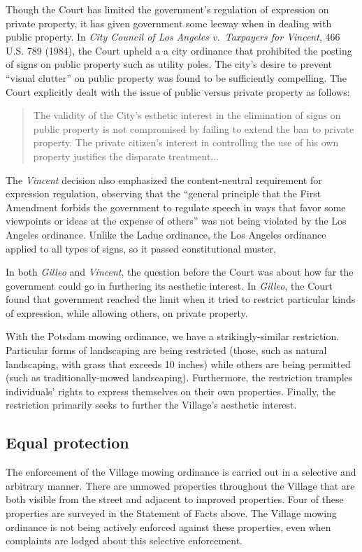 \documentclass[12pt]{article}
\begin{document}
Though the Court has limited the government's regulation of expression on private property, it has given government some leeway when in dealing with public property.
In {\em City Council of Los Angeles v.\ Taxpayers for Vincent}, 466 U.S. 789 (1984), the Court upheld a a city ordinance that prohibited the posting of signs on public property such as utility poles.
The city's desire to prevent ``visual clutter'' on public property was found to be sufficiently compelling.
The Court explicitly dealt with the issue of public versus private property as follows:
\begin{quote}
The validity of the City's esthetic interest in the elimination of signs on public property is not compromised by failing to extend the ban to private property.  The private citizen's interest in controlling the use of his own property justifies the disparate treatment...
\end{quote}
The {\em Vincent} decision also emphasized the content-neutral requirement for expression regulation, observing that the ``general principle that the First Amendment forbids the government to regulate speech in ways that favor some viewpoints or ideas at the expense of others'' was not being violated by the Los Angeles ordinance.
Unlike the Ladue ordinance, the Los Angeles ordinance applied to all types of signs, so it passed constitutional muster,  

In both {\em Gilleo} and {\em Vincent}, the question before the Court was about how far the government could go in furthering its aesthetic interest.
In {\em Gilleo}, the Court found that government reached the limit when it tried to restrict particular kinds of expression, while allowing others, on private property.

With the Potsdam mowing ordinance, we have a strikingly-similar restriction.
Particular forms of landscaping are being restricted (those, such as natural landscaping, with grass that exceeds 10 inches) while others are being permitted (such as traditionally-mowed landscaping).
Furthermore, the restriction tramples individuals' rights to express themselves on their own properties.  
Finally, the restriction primarily seeks to further the Village's aesthetic interest.



\subsection{Equal protection}

The enforcement of the Village mowing ordinance is carried out in a selective and arbitrary manner.
There are unmowed properties throughout the Village that are both visible from the street and adjacent to improved properties.
Four of these properties are surveyed in the Statement of Facts above.
The Village mowing ordinance is not being actively enforced against these properties, even when complaints are lodged about this selective enforcement. 
\end{document}
